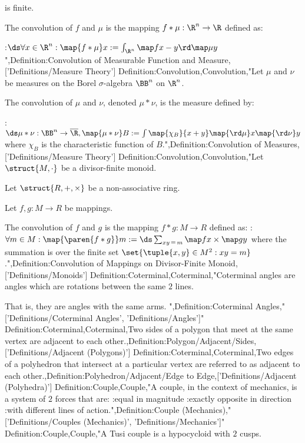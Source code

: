 is finite.


The convolution of $f$ and $\mu$ is the mapping $f * \mu: \R^n \to \R$ defined as:

:$\ds \forall x \in \R^n: \map {f * \mu} x := \int_{\R^n} \map f {x - y} \rd \map \mu y$",Definition:Convolution of Measurable Function and Measure,['Definitions/Measure Theory']
Definition:Convolution,Convolution,"Let $\mu$ and $\nu$ be measures on the Borel $\sigma$-algebra $\BB^n$ on $\R^n$.


The convolution of $\mu$ and $\nu$, denoted $\mu * \nu$, is the measure defined by:

:$\ds \mu * \nu: \BB^n \to \overline \R, \map {\mu * \nu} B := \int \map {\chi_B} {x + y} \map {\rd \mu} x \map {\rd \nu} y$
where $\chi_B$ is the characteristic function of $B$.",Definition:Convolution of Measures,['Definitions/Measure Theory']
Definition:Convolution,Convolution,"Let $\struct {M, \cdot}$ be a divisor-finite monoid.

Let $\struct {R, +, \times}$ be a non-associative ring.

Let $f, g : M \to R$ be mappings.


The convolution of $f$ and $g$ is the mapping $f * g: M \to R$ defined as:
:$\forall m \in M: \map {\paren {f * g} } m := \ds \sum_{x y \mathop = m} \map f x \times \map g y$
where the summation is over the finite set $\set {\tuple {x, y} \in M^2: x y = m}$.",Definition:Convolution of Mappings on Divisor-Finite Monoid,['Definitions/Monoids']
Definition:Coterminal,Coterminal,"Coterminal angles are angles which are rotations between the same $2$ lines.

That is, they are angles with the same arms.
",Definition:Coterminal Angles,"['Definitions/Coterminal Angles', 'Definitions/Angles']"
Definition:Coterminal,Coterminal,Two sides of a polygon that meet at the same vertex are adjacent to each other.,Definition:Polygon/Adjacent/Sides,['Definitions/Adjacent (Polygons)']
Definition:Coterminal,Coterminal,Two edges of a polyhedron that intersect at a particular vertex are referred to as adjacent to each other.,Definition:Polyhedron/Adjacent/Edge to Edge,['Definitions/Adjacent (Polyhedra)']
Definition:Couple,Couple,"A couple, in the context of mechanics, is a system of $2$ forces that are:
:equal in magnitude
:exactly opposite in direction
:with different lines of action.",Definition:Couple (Mechanics),"['Definitions/Couples (Mechanics)', 'Definitions/Mechanics']"
Definition:Couple,Couple,"A Tusi couple is a hypocycloid with $2$ cusps.


